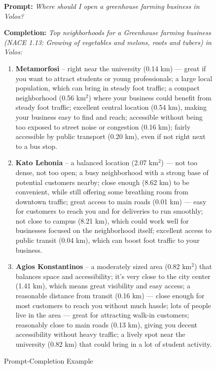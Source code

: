 \begin{figure}[htbp]
  \centering
  \begin{tcolorbox}[myexample, title={Prompt-Completion Example}]
  \textbf{Prompt:} \emph{Where should I open a greenhouse farming business in Volos?}

  \vspace{0.5\baselineskip}
  \textbf{Completion:} \emph{Top neighborhoods for a Greenhouse farming business (NACE 1.13: Growing of vegetables and melons, roots and tubers) in Volos:}
  \begin{enumerate}
    \item \textbf{Metamorfosi} -- right near the university (0.14 km) --- great if you want to attract students or young professionals; a large local population, which can bring in steady foot traffic; a compact neighborhood (0.56 km$^{2}$) where your business could benefit from steady foot traffic; excellent central location (0.54 km), making your business easy to find and reach; accessible without being too exposed to street noise or congestion (0.16 km); fairly accessible by public transport (0.20 km), even if not right next to a bus stop.
    \item \textbf{Kato Lehonia} -- a balanced location (2.07 km$^{2}$) --- not too dense, not too open; a busy neighborhood with a strong base of potential customers nearby; close enough (8.62 km) to be convenient, while still offering some breathing room from downtown traffic; great access to main roads (0.01 km) --- easy for customers to reach you and for deliveries to run smoothly; not close to campus (8.21 km), which could work well for businesses focused on the neighborhood itself; excellent access to public transit (0.04 km), which can boost foot traffic to your business.
    \item \textbf{Agios Konstantinos} -- a moderately sized area (0.82 km$^{2}$) that balances space and accessibility; it's very close to the city center (1.41 km), which means great visibility and easy access; a reasonable distance from transit (0.16 km) --- close enough for most customers to reach you without much hassle; lots of people live in the area --- great for attracting walk-in customers; reasonably close to main roads (0.13 km), giving you decent accessibility without heavy traffic; a lively spot near the university (0.82 km) that could bring in a lot of student activity.
  \end{enumerate}
  \end{tcolorbox}
  \caption{Prompt-Completion Example}
  \label{ex:prompt_completion_greenhouse}
\end{figure}



